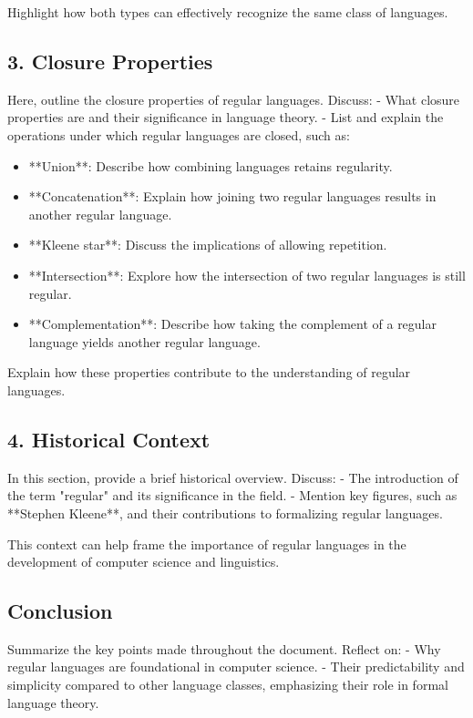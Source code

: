 \documentclass[lettersize,journal]{IEEEtran}
\begin{document}
Highlight how both types can effectively recognize the same class of languages.
\subsection*{3. Closure Properties}

Here, outline the closure properties of regular languages. Discuss:
- What closure properties are and their significance in language theory.
- List and explain the operations under which regular languages are closed, such as:
\begin{itemize}
    \item **Union**: Describe how combining languages retains regularity.
    \item **Concatenation**: Explain how joining two regular languages results in another regular language.
    \item **Kleene star**: Discuss the implications of allowing repetition.
    \item **Intersection**: Explore how the intersection of two regular languages is still regular.
    \item **Complementation**: Describe how taking the complement of a regular language yields another regular language.
\end{itemize}

Explain how these properties contribute to the understanding of regular languages.

\subsection*{4. Historical Context}

In this section, provide a brief historical overview. Discuss:
- The introduction of the term "regular" and its significance in the field.
- Mention key figures, such as **Stephen Kleene**, and their contributions to formalizing regular languages.

This context can help frame the importance of regular languages in the development of computer science and linguistics.

\subsection*{Conclusion}

Summarize the key points made throughout the document. Reflect on:
- Why regular languages are foundational in computer science.
- Their predictability and simplicity compared to other language classes, emphasizing their role in formal language theory.
\end{document}
